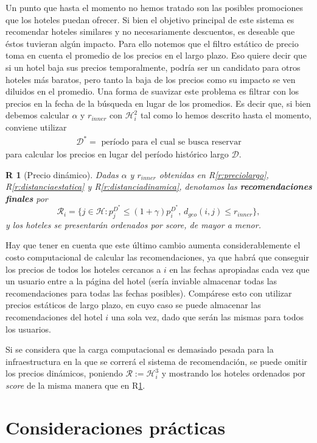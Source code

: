 \documentclass[12pt]{report}
\newcommand{\HH}{\mathcal{H}}
\newcommand{\RR}{\mathcal{R}}
\newtheorem{regla}{R}%
\begin{document}
Un punto que hasta el momento no hemos tratado son las posibles promociones que los hoteles puedan ofrecer. Si bien el objetivo principal de este sistema es recomendar hoteles similares y no necesariamente descuentos, es deseable que éstos tuvieran algún impacto. Para ello notemos que el filtro estático de precio toma en cuenta el promedio de los precios en el largo plazo. Eso quiere decir que si un hotel baja sus precios temporalmente, podría ser un candidato para otros hoteles más baratos, pero tanto la baja de los precios como su impacto se ven diluidos en el promedio. Una forma de suavizar este problema es filtrar con los precios en la fecha de la búsqueda en lugar de los promedios. Es decir que, si bien debemos calcular $\alpha$ y $r_{inner}$ con $\HH_i^2$ tal como lo hemos descrito hasta el momento, conviene utilizar
\begin{align}
	\mathcal{D^*} = \text{ período para el cual se busca reservar}
\end{align}
para calcular los precios en lugar del período histórico largo $\mathcal{D}$.
\begin{regla}[Precio dinámico] \label{r:preciodinamico}
Dadas $\alpha$ y $r_{inner}$ obtenidas en R\ref{r:preciolargo}, R\ref{r:distanciaestatica} y R\ref{r:distanciadinamica}, denotamos las \textbf{recomendaciones finales} por
\[
\RR_i = \{j \in \HH : p^{D^*}_j \leq (1 + \gamma)p^{D^*}_i \text{,  } d_{geo}(i,j) \leq r_{inner}\},
\]
y los hoteles se presentarán ordenados por \emph{score}, de mayor a menor.
\end{regla}
Hay que tener en cuenta que este último cambio aumenta considerablemente el costo computacional de calcular las recomendaciones, ya que habrá que conseguir los precios de todos los hoteles cercanos a $i$ en las fechas apropiadas cada vez que un usuario entre a la página del hotel (sería inviable almacenar todas las recomendaciones para todas las fechas posibles). Compárese esto con utilizar precios estáticos de largo plazo, en cuyo caso se puede almacenar las recomendaciones del hotel $i$ una sola vez, dado que serán las mismas para todos los usuarios.

Si se considera que la carga computacional es demasiado pesada para la infraestructura en la que se correrá el sistema de recomendación, se puede omitir los precios dinámicos, poniendo $\RR := \HH_i^3$ y mostrando los hoteles ordenados por \emph{score} de la misma manera que en R\ref{r:preciodinamico}.

\section{Consideraciones prácticas}
\end{document}
